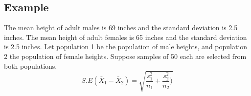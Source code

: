 
\subsection{Example}
The mean height of adult males is 69 inches and the standard
deviation is 2.5 inches. The mean height of adult females is 65
inches and the standard deviation is 2.5 inches. Let population 1
be the population of male heights, and population 2 the population
of female heights. Suppose samples of 50 each are selected from
both populations.
\begin{equation}
S.E(\bar{X}_{1}-\bar{X}_{2}) =
\sqrt{\frac{s^2_{1}}{n_{1}}+\frac{s^2_{2}}{n_{2}})}
\end{equation}
